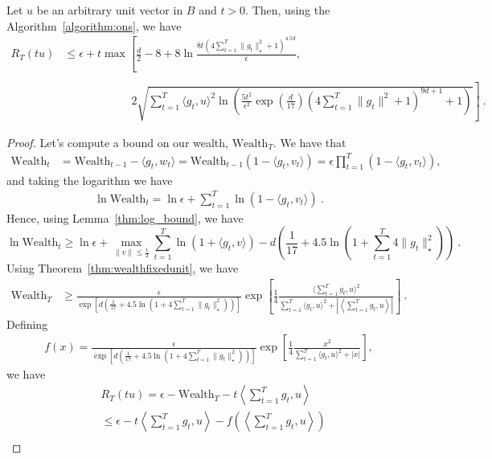 \documentclass[12pt]{colt2018} %
\newcommand{\wealth}{\text{Wealth}}
\begin{document}
\begin{lemma}\label{thm:regretfixedunit}
Let $u$ be an arbitrary unit vector in $B$ and $t>0$. Then, using the Algorithm~\ref{algorithm:ons}, we have
\begin{align*}
R_T(tu) 
&\leq \epsilon+t 
\max\left[\frac{d}{2}-8+8\ln\frac{8t\left(4\sum_{t=1}^T \|g_t\|^2_\star +1\right)^{4.5d}}{\epsilon},\right.\\\\
&\quad\quad\quad\quad\quad\quad\left.2\sqrt{\sum_{t=1}^T \langle g_t,u\rangle^2 \ln\left(\frac{5t^2}{\epsilon^2}\exp\left(\frac{d}{17}\right)\left(4\sum_{t=1}^T \|g_t\|^2+1\right)^{9d+1}+1\right)}\right]~.
\end{align*}
\end{lemma}
%
\begin{proof}
Let's compute a bound on our wealth, $\wealth_T$. We have that
\begin{align*}
\wealth_t 
&= \wealth_{t-1} - \langle g_t, w_t\rangle
= \wealth_{t-1}(1-\langle g_t, v_t\rangle)
= \epsilon \prod_{t=1}^T (1-\langle g_t, v_t\rangle),
\end{align*}
and taking the logarithm we have
\begin{align*}
\ln \wealth_t 
= \ln \epsilon + \sum_{t=1}^T \ln(1-\langle g_t, v_t\rangle)~.
\end{align*}
Hence, using Lemma~\ref{thm:log_bound}, we have
\[
\ln \wealth_t \geq \ln \epsilon + \max_{\|v\|\leq \frac{1}{2}} \sum_{t=1}^T \ln(1+\langle g_t, v\rangle)-d \left(\frac{1}{17}+4.5\ln\left(1+\sum_{t=1}^T 4\|g_t\|^2_\star \right)\right)~.
\]
Using Theorem~\ref{thm:wealthfixedunit}, we have
\begin{align*}
\wealth_T
&\ge \frac{\epsilon}{\exp\left[d \left(\frac{1}{17}+4.5\ln\left(1+4\sum_{t=1}^T \|g_t\|^2_\star \right)\right)\right]} \exp\left[\frac{1}{4}\frac{\langle \sum_{t=1}^T g_t, u\rangle^2}{\sum_{t=1}^T \langle g_t,u\rangle^2+\left|\left \langle \sum_{t=1}^T g_t,u\right\rangle\right|}\right]~.
\end{align*}
Defining
\begin{align*}
f(x) = \frac{\epsilon}{\exp\left[d \left(\frac{1}{17}+4.5\ln\left(1+4\sum_{t=1}^T \|g_t\|^2_\star \right)\right)\right]}\exp\left[\frac{1}{4}\frac{x^2}{\sum_{t=1}^T \langle g_t,u\rangle^2+|x|}\right],
\end{align*}
we have
\begin{align*}
&R_T(t u) 
= \epsilon-\wealth_T-t\left\langle \sum_{t=1}^T g_t, u\right\rangle\\
&\leq\epsilon-t\left\langle \sum_{t=1}^T g_t, u\right\rangle -f\left(\left\langle \sum_{t=1}^T g_t, u\right\rangle\right)\\

\end{align*}
\end{proof}
\end{document}
